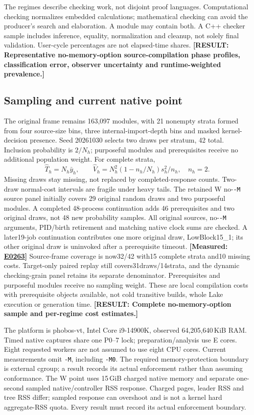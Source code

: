 \documentclass[10pt,twocolumn]{article}
\newcommand{\missing}[1]{\textbf{[RESULT: #1]}}
\newcommand{\measured}[1]{\textbf{[Measured: #1]}}
\newcommand{\expref}[2]{\href{https://github.com/yunwei37/proofserve/blob/main/docs/tmp/build-and-evaluate/step-#1/step-report.md}{E#2}}
\begin{document}
The regimes describe checking work, not disjoint proof languages.
Computational checking normalizes embedded calculations; mathematical
checking can avoid the producer's search and elaboration.
A module may contain both. A C++ checker sample includes inference, equality,
normalization and cleanup, not solely final validation.
User-cycle percentages are not elapsed-time shares.
\missing{Representative no-memory-option source-compilation phase profiles,
classification error, observer uncertainty and runtime-weighted prevalence.}

\subsection{Sampling and current native point}
The original frame remains 163,097 modules, with 21 nonempty strata formed
from four source-size bins, three internal-import-depth bins and
masked kernel-decision presence.
Seed 20261030 selects two draws per stratum, 42 total.
Inclusion probability is $2/N_h$; purposeful modules and prerequisites
receive no additional population weight.
For complete strata,
\[
\widehat T_h=N_h\bar y_h,\qquad
\widehat V_h=N_h^2(1-n_h/N_h)s_h^2/n_h,\quad n_h=2.
\]
Missing draws stay missing, not replaced by completed-response counts.
Two-draw normal-cost intervals are fragile under heavy tails.
The retained W no-\texttt{-M} source panel initially covers 29 original
random draws and two purposeful modules.
A completed 48-process continuation adds 46 prerequisites and two original
draws, not 48 new probability samples.
All original sources, no-\texttt{-M} arguments, PID/birth retirement and
matching native clock sums are checked.
A later19-job continuation contributes one more original draw, LowBlock15\_1;
its other original draw is uninvoked after a prerequisite timeout.
\measured{\expref{0263-20261102T040256+0000}{0263}}
Source-frame coverage is now32/42 with15 complete strata and10 missing
costs. Target-only paired replay still covers31draws/14strata, and the
dynamic checking-grain panel retains its separate denominator.
Prerequisites and purposeful modules receive no sampling weight.
These are local compilation costs with prerequisite objects available,
not cold transitive builds, whole Lake execution or generation time.
\missing{Complete no-memory-option sample and per-regime cost estimates.}

The platform is phobos-vt, Intel Core i9-14900K,
observed 64,205,640\,KiB RAM.
Timed native captures share one P0--7 lock; preparation/analysis use E cores.
Eight requested workers are not assumed to use eight CPU cores.
Current measurements omit \texttt{-M}, including \texttt{-M0}.
The required memory-protection boundary is external cgroup;
a result records its actual enforcement rather than assuming conformance.
The W point uses 15\,GiB charged native memory and separate one-second
sampled native/controller RSS response.
Charged pages, leader RSS and tree RSS differ; sampled response can overshoot
and is not a kernel hard aggregate-RSS quota.
Every result must record its actual enforcement boundary.
\end{document}

